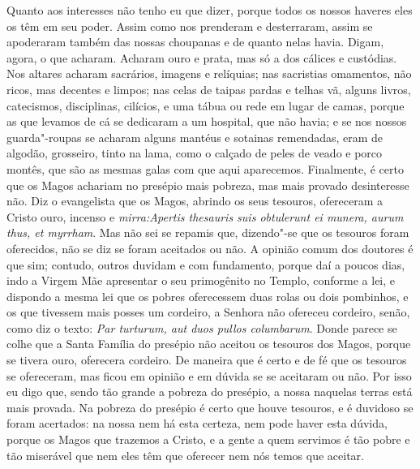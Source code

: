Quanto aos interesses não tenho eu que dizer, porque todos os nossos
haveres eles os têm em seu poder. Assim como nos prenderam e
desterraram, assim se apoderaram também das nossas choupanas e de quanto
nelas havia. Digam, agora, o que acharam. Acharam ouro e prata, mas só a
dos cálices e custódias. Nos altares acharam sacrários, imagens e
relíquias; nas sacristias omamentos, não ricos, mas decentes e limpos;
nas celas de taipas pardas e telhas vã, alguns livros, catecismos,
disciplinas, cilícios, e uma tábua ou rede em lugar de camas, porque as
que levamos de cá se dedicaram a um hospital, que não havia; e se nos
nossos guarda"-roupas se acharam alguns mantéus e sotainas remendadas,
eram de algodão, grosseiro, tinto na lama, como o calçado de peles de
veado e porco montês, que são as mesmas galas com que aqui aparecemos.
Finalmente, é certo que os Magos achariam no presépio mais pobreza, mas
mais provado desinteresse não. Diz o evangelista que os Magos, abrindo
os seus tesouros, ofereceram a Cristo ouro, incenso e
\emph{mirra:Apertis thesauris suis obtulerunt ei munera, aurum thus, et
myrrham}. Mas não sei se repamis que, dizendo"-se que os %
tesouros foram oferecidos, não se diz se foram aceitados ou não. A
opinião comum dos doutores é que sim; contudo, outros duvidam e com
fundamento, porque daí a poucos dias, indo a Virgem Mãe apresentar o seu
primogênito no Templo, conforme a lei, e dispondo a mesma lei que os
pobres oferecessem duas rolas ou dois pombinhos, e os que tivessem mais
posses um cordeiro, a Senhora não ofereceu cordeiro, senão, como diz o
texto: \emph{Par turturum, aut duos pullos columbarum}.
Donde parece se colhe que a Santa Família do presépio não aceitou os
tesouros dos Magos, porque se tivera ouro, oferecera cordeiro. De
maneira que é certo e de fé que os tesouros se ofereceram, mas ficou em
opinião e em dúvida se se aceitaram ou não. Por isso eu digo que, sendo
tão grande a pobreza do presépio, a nossa naquelas terras está mais
provada. Na pobreza do presépio é certo que houve tesouros, e é duvidoso
se foram acertados: na nossa nem há esta certeza, nem pode haver esta
dúvida, porque os Magos que trazemos a Cristo, e a gente a quem servimos
é tão pobre e tão miserável que nem eles têm que oferecer nem nós temos
que aceitar.

